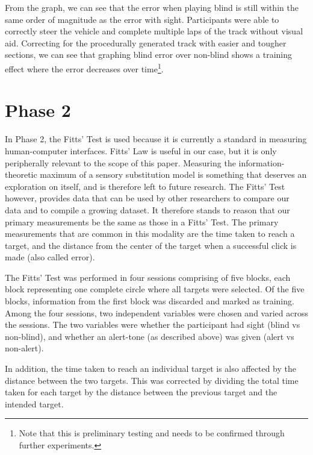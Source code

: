 \documentclass[
12pt, %
oneside, %
english, %
doublespacing, %
headsepline, %
]{MastersDoctoralThesis} %
\begin{document}
From the graph, we can see that the error when playing blind is still within the same order of magnitude as the error with sight. Participants were able to correctly steer the vehicle and complete multiple laps of the track without visual aid. Correcting for the procedurally generated track with easier and tougher sections, we can see that graphing blind error over non-blind shows a training effect where the error decreases over time\footnote{Note that this is preliminary testing and needs to be confirmed through further experiments.}.

\section{Phase 2}

In Phase 2, the Fitts' Test is used because it is currently a standard in measuring human-computer interfaces. Fitts' Law is useful in our case, but it is only peripherally relevant to the scope of this paper. Measuring the information-theoretic maximum of a sensory substitution model is something that deserves an exploration on itself, and is therefore left to future research. The Fitts' Test however, provides data that can be used by other researchers to compare our data and to compile a growing dataset. It therefore stands to reason that our primary measurements be the same as those in a Fitts' Test. The primary measurements that are common in this modality \parencite{mackenzie_extending_1992} \parencite{chun_evaluating_2004} are the time taken to reach a target, and the distance from the center of the target when a successful click is made (also called error).

The Fitts' Test was performed in four sessions comprising of five blocks, each block representing one complete circle where all targets were selected. Of the five blocks, information from the first block was discarded and marked as training. Among the four sessions, two independent variables were chosen and varied across the sessions. The two variables were whether the participant had sight (blind vs non-blind), and whether an alert-tone (as described above) was given (alert vs non-alert).

In addition, the time taken to reach an individual target is also affected by the distance between the two targets. This was corrected by dividing the total time taken for each target by the distance between the previous target and the intended target.
\end{document}
